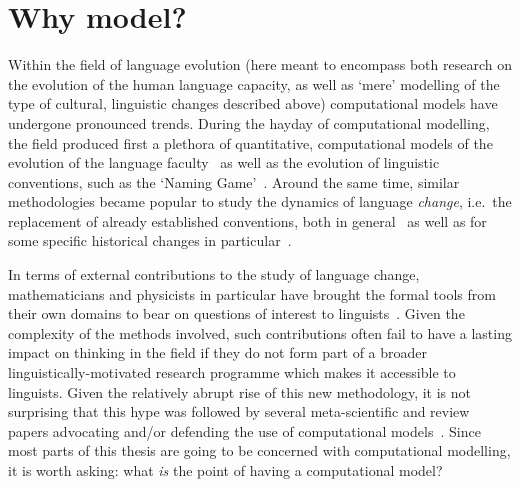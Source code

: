 \section{Why model?}

Within the field of language evolution (here meant to encompass both research on the evolution of the human language capacity, as well as `mere' modelling of the type of cultural, linguistic changes described above) computational models have undergone pronounced trends. %
During the hayday of computational modelling, the field produced first a plethora of quantitative, computational models of the evolution of the language faculty~\citep{Kirby1999,Nowak2001a} as well as the evolution of linguistic conventions, such as the `Naming Game'~\citep{Baronchelli2008}. Around the same time, similar methodologies became popular to study the dynamics of language \emph{change}, i.e.~the replacement of already established conventions, both in general~\citep{Niyogi1995,Niyogi1997,Arita1998,Nettle1999,Kataoka2000,Livingstone2000,DeOliveira2005,Niyogi2006,Wedel2006,Baxter2006,Wedel2007,Ettlinger2007b,Ettlinger2007,Ritt2009,Fagyal2010,Blythe2012,Gong2012,Otero-Espinar2013,Soskuthy2013,Pierrehumbert2014,Enke2016} as well as for some specific historical changes in particular~\citep{Yang2002,Pearl2007,Troutman2008,Baxter2009,Sonderegger2010,Swarup2012,Ritt2012,Kirby2013,Kirby2013cogsci}. %

In terms of external contributions to the study of language change, mathematicians and physicists in particular have brought the formal tools from their own domains to bear on questions of interest to linguists~\citep{Castellano2009,Blythe2015}. Given the complexity of the methods involved, such contributions often fail to have a lasting impact on thinking in the field if they do not form part of a broader linguistically-motivated research programme which makes it accessible to linguists. %
Given the relatively abrupt rise of this new methodology, it is not surprising that this hype was followed by several meta-scientific and review papers advocating and/or defending the use of computational models~\citep{Wang2004,DeBoer2006,Baker2008,Jaeger2009,Hruschka2009,Vogt2010,DeBoer2012EvoLang,Smith2016}.
Since most parts of this thesis are going to be concerned with computational modelling, it is worth asking: what \emph{is} the point of having a computational model?


